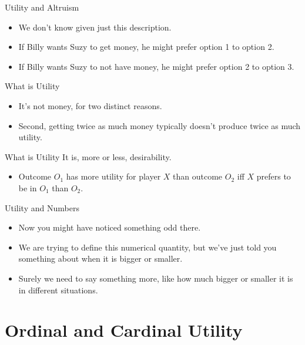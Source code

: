 \documentclass[
  14pt,
  letterpaper,
  ignorenonframetext,
  aspectratio=169,
]{beamer}
\providecommand{\tightlist}{%
  \setlength{\itemsep}{0pt}\setlength{\parskip}{0pt}}\usepackage{longtable,booktabs,array}
\let\olditem\item
\renewcommand{\item}{%
\olditem\vspace{6pt}}
\begin{document}
\begin{frame}{Utility and Altruism}
\protect\hypertarget{utility-and-altruism-1}{}
\begin{itemize}[<+->]
\tightlist
\item
  We don't know given just this description.
\item
  If Billy wants Suzy to get money, he might prefer option 1 to option
  2.
\item
  If Billy wants Suzy to not have money, he might prefer option 2 to
  option 3.
\end{itemize}
\end{frame}

\begin{frame}{What is Utility}
\protect\hypertarget{what-is-utility-3}{}
\begin{itemize}[<+->]
\tightlist
\item
  It's not money, for two distinct reasons.
\item
  Second, getting twice as much money typically doesn't produce twice as
  much utility.
\end{itemize}
\end{frame}

\begin{frame}{What is Utility}
\protect\hypertarget{what-is-utility-4}{}
It is, more or less, desirability.

\begin{itemize}[<+->]
\tightlist
\item
  Outcome \(O_1\) has more utility for player \(X\) than outcome \(O_2\)
  iff \(X\) prefers to be in \(O_1\) than \(O_2\).
\end{itemize}
\end{frame}

\begin{frame}{Utility and Numbers}
\protect\hypertarget{utility-and-numbers}{}
\begin{itemize}[<+->]
\tightlist
\item
  Now you might have noticed something odd there.
\item
  We are trying to define this numerical quantity, but we've just told
  you something about when it is bigger or smaller.
\item
  Surely we need to say something more, like how much bigger or smaller
  it is in different situations.
\end{itemize}
\end{frame}

\hypertarget{ordinal-and-cardinal-utility}{%
\section{Ordinal and Cardinal
Utility}\label{ordinal-and-cardinal-utility}}
\end{document}
